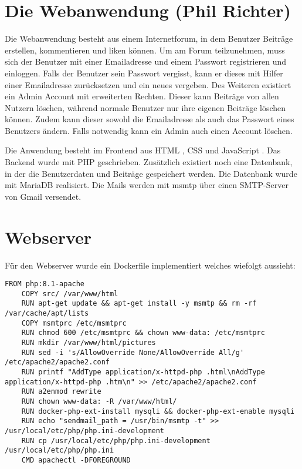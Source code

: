 \chapter{Die Webanwendung (Phil Richter)}
Die Webanwendung besteht aus einem Internetforum, in dem Benutzer Beiträge erstellen, kommentieren und liken
können. Um am Forum teilzunehmen, muss sich der Benutzer mit einer Emailadresse und einem Passwort registrieren und einloggen.
Falls der Benutzer sein Passwort vergisst, kann er dieses mit Hilfer einer Emailadresse zurücksetzen und ein neues vergeben. 
Des Weiteren existiert ein Admin Account mit erweiterten Rechten. Dieser kann Beiträge von allen Nutzern
löschen, während normale Benutzer nur ihre eigenen Beiträge löschen können. Zudem kann dieser sowohl die Emailadresse als auch
das Passwort eines Benutzers ändern. Falls notwendig kann ein Admin auch einen Account löschen.

Die Anwendung besteht im Frontend aus HTML \cite{noauthor_html_nodate}, CSS \cite{noauthor_cascading_nodate} und JavaScript
\cite{noauthor_learn_nodate}. Das Backend wurde mit PHP \cite{noauthor_php_2024} geschrieben. Zusätzlich existiert noch eine
Datenbank, in der die Benutzerdaten und Beiträge gespeichert werden. Die Datenbank wurde mit MariaDB \cite{noauthor_mariadb_nodate}
realisiert. Die Mails werden mit msmtp \cite{noauthor_msmtp_nodate} über einen SMTP-Server von Gmail versendet.

\chapter{Webserver}
Für den Webserver wurde ein Dockerfile implementiert welches wiefolgt aussieht:
\begin{lstlisting}[caption={\texttt{dockerfile}},captionpos=b, breaklines=true]
    FROM php:8.1-apache
    COPY src/ /var/www/html
    RUN apt-get update && apt-get install -y msmtp && rm -rf /var/cache/apt/lists
    COPY msmtprc /etc/msmtprc
    RUN chmod 600 /etc/msmtprc && chown www-data: /etc/msmtprc
    RUN mkdir /var/www/html/pictures
    RUN sed -i 's/AllowOverride None/AllowOverride All/g' /etc/apache2/apache2.conf
    RUN printf "AddType application/x-httpd-php .html\nAddType application/x-httpd-php .htm\n" >> /etc/apache2/apache2.conf
    RUN a2enmod rewrite
    RUN chown www-data: -R /var/www/html/
    RUN docker-php-ext-install mysqli && docker-php-ext-enable mysqli
    RUN echo "sendmail_path = /usr/bin/msmtp -t" >> /usr/local/etc/php/php.ini-development
    RUN cp /usr/local/etc/php/php.ini-development /usr/local/etc/php/php.ini
    CMD apachectl -DFOREGROUND
\end{lstlisting}

